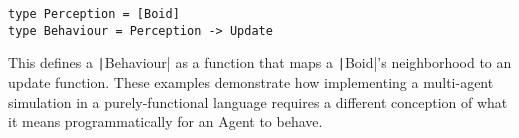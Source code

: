 \begin{verbatim}
type Perception = [Boid]
type Behaviour = Perception -> Update
\end{verbatim}

This defines a \texttt|Behaviour| as a function that maps a \texttt|Boid|'s neighborhood to
an update function. These examples demonstrate how implementing a multi-agent
simulation in a purely-functional language requires a different conception of
what it means programmatically for an Agent to behave.

\pagebreak

 
 


